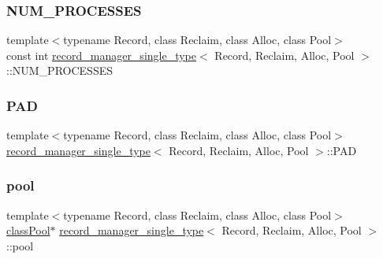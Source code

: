 \subsubsection{\texorpdfstring{N\+U\+M\+\_\+\+P\+R\+O\+C\+E\+S\+S\+ES}{NUM\_PROCESSES}}
{\footnotesize\ttfamily template$<$typename Record, class Reclaim, class Alloc, class Pool$>$ \\
const int \hyperlink{classrecord__manager__single__type}{record\+\_\+manager\+\_\+single\+\_\+type}$<$ Record, Reclaim, Alloc, Pool $>$\+::N\+U\+M\+\_\+\+P\+R\+O\+C\+E\+S\+S\+ES}

\mbox{\label{classrecord__manager__single__type_aa8000dd2cb059f78ca77ccef6800166d}} 
\subsubsection{\texorpdfstring{P\+AD}{PAD}}
{\footnotesize\ttfamily template$<$typename Record, class Reclaim, class Alloc, class Pool$>$ \\
\hyperlink{classrecord__manager__single__type}{record\+\_\+manager\+\_\+single\+\_\+type}$<$ Record, Reclaim, Alloc, Pool $>$\+::P\+AD}

\mbox{\label{classrecord__manager__single__type_a396149240bef252c12fe9f6418e7594d}} 
\subsubsection{\texorpdfstring{pool}{pool}}
{\footnotesize\ttfamily template$<$typename Record, class Reclaim, class Alloc, class Pool$>$ \\
\hyperlink{classrecord__manager__single__type_a2a7217967912e867c7ab6e4a7f3deeb5}{class\+Pool}$\ast$ \hyperlink{classrecord__manager__single__type}{record\+\_\+manager\+\_\+single\+\_\+type}$<$ Record, Reclaim, Alloc, Pool $>$\+::pool}

\mbox{\label{classrecord__manager__single__type_ad79e8a67f4a66c8d7ed83764aaade7d9}} 
